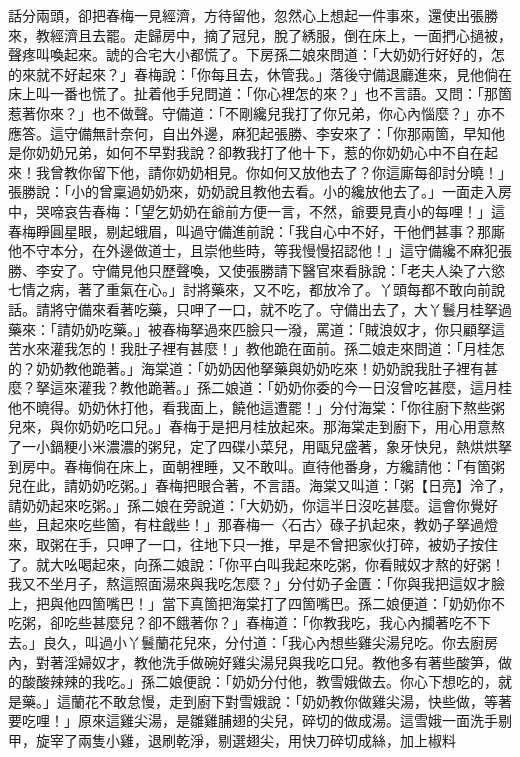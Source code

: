 話分兩頭，卻把春梅一見經濟，方待留他，忽然心上想起一件事來，還使出張勝來，教經濟且去罷。走歸房中，摘了冠兒，脫了綉服，倒在床上，一面捫心撾被，聲疼叫喚起來。諕的合宅大小都慌了。下房孫二娘來問道：「大奶奶行好好的，怎的來就不好起來？」春梅說：「你每且去，休管我。」落後守備退廳進來，見他倘在床上叫一番也慌了。扯着他手兒問道：「你心裡怎的來？」也不言語。又問：「那箇惹著你來？」也不做聲。守備道：「不剛纔兒我打了你兄弟，你心內惱麼？」亦不應答。這守備無計奈何，自出外邊，麻犯起張勝、李安來了：「你那兩箇，早知他是你奶奶兄弟，如何不早對我說？卻教我打了他十下，惹的你奶奶心中不自在起來！我曾教你留下他，請你奶奶相見。你如何又放他去了？你這廝每卻討分曉！」張勝說：「小的曾稟過奶奶來，奶奶說且教他去看。小的纔放他去了。」一面走入房中，哭啼哀告春梅：「望乞奶奶在爺前方便一言，不然，爺要見責小的每哩！」這春梅睜圓星眼，剔起蛾眉，叫過守備進前說：「我自心中不好，干他們甚事？那廝他不守本分，在外邊做道士，且崇他些時，等我慢慢招認他！」這守備纔不麻犯張勝、李安了。守備見他只歷聲喚，又使張勝請下醫官來看脉說：「老夫人染了六慾七情之病，著了重氣在心。」討將藥來，又不吃，都放冷了。丫頭每都不敢向前說話。請將守備來看著吃藥，只呷了一口，就不吃了。守備出去了，大丫鬟月桂拏過藥來：「請奶奶吃藥。」被春梅拏過來匹臉只一潑，罵道：「賊浪奴才，你只顧拏這苦水來灌我怎的！我肚子裡有甚麼！」教他跪在面前。孫二娘走來問道：「月桂怎的？奶奶教他跪著。」海棠道：「奶奶因他拏藥與奶奶吃來！奶奶說我肚子裡有甚麼？拏這來灌我？教他跪著。」孫二娘道：「奶奶你委的今一日沒曾吃甚麼，這月桂他不曉得。奶奶休打他，看我面上，饒他這遭罷！」分付海棠：「你往廚下熬些粥兒來，與你奶奶吃口兒。」春梅于是把月桂放起來。那海棠走到廚下，用心用意熬了一小鍋粳小米濃濃的粥兒，定了四碟小菜兒，用甌兒盛著，象牙快兒，熱烘烘拏到房中。春梅倘在床上，面朝裡睡，又不敢叫。直待他番身，方纔請他：「有箇粥兒在此，請奶奶吃粥。」春梅把眼合著，不言語。海棠又叫道：「粥【日亮】泠了，請奶奶起來吃粥。」孫二娘在旁說道：「大奶奶，你這半日沒吃甚麼。這會你覺好些，且起來吃些箇，有柱戧些！」那春梅一〈石古〉碌子扒起來，教奶子拏過燈來，取粥在手，只呷了一口，往地下只一推，早是不曾把家伙打碎，被奶子按住了。就大吆喝起來，向孫二娘說：「你平白叫我起來吃粥，你看賊奴才熬的好粥！我又不坐月子，熬這照面湯來與我吃怎麼？」分付奶子金匱：「你與我把這奴才臉上，把與他四箇嘴巴！」當下真箇把海棠打了四箇嘴巴。孫二娘便道：「奶奶你不吃粥，卻吃些甚麼兒？卻不餓著你？」春梅道：「你教我吃，我心內攔著吃不下去。」良久，叫過小丫鬟蘭花兒來，分付道：「我心內想些雞尖湯兒吃。你去廚房內，對著淫婦奴才，教他洗手做碗好雞尖湯兒與我吃口兒。教他多有著些酸笋，做的酸酸辣辣的我吃。」孫二娘便說：「奶奶分付他，教雪娥做去。你心下想吃的，就是藥。」這蘭花不敢怠慢，走到廚下對雪娥說：「奶奶教你做雞尖湯，快些做，等著要吃哩！」原來這雞尖湯，是雛雞脯翅的尖兒，碎切的做成湯。這雪娥一面洗手剔甲，旋宰了兩隻小雞，退刷乾淨，剔選翅尖，用快刀碎切成絲，加上椒料 